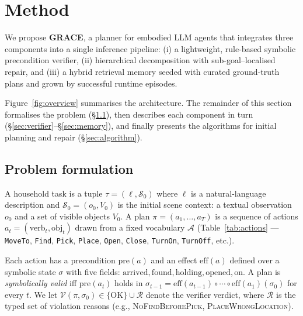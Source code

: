 
\section{Method}\label{sec:method}

We propose \textbf{GRACE}, a planner for embodied LLM agents that
integrates three components into a single inference pipeline:
(i) a lightweight, rule-based symbolic precondition verifier,
(ii) hierarchical decomposition with sub-goal--localised repair, and
(iii) a hybrid retrieval memory seeded with curated ground-truth plans
and grown by successful runtime episodes.

Figure~\ref{fig:overview} summarises the architecture. The remainder of
this section formalises the problem (\S\ref{sec:problem}), then describes
each component in turn (\S\ref{sec:verifier}--\S\ref{sec:memory}),
and finally presents the algorithms for initial planning and repair
(\S\ref{sec:algorithm}).

\subsection{Problem formulation}\label{sec:problem}

A household task is a tuple $\tau = (\ell, \mathcal{S}_0)$ where
$\ell$ is a natural-language description and
$\mathcal{S}_0 = (o_0, V_0)$ is the initial scene context: a textual
observation $o_0$ and a set of visible objects $V_0$. A plan
$\pi = (a_1, \dots, a_T)$ is a sequence of actions
$a_t = (\mathrm{verb}_t, \mathrm{obj}_t)$ drawn from a fixed
vocabulary $\mathcal{A}$ (Table~\ref{tab:actions} —
\texttt{MoveTo}, \texttt{Find}, \texttt{Pick}, \texttt{Place},
\texttt{Open}, \texttt{Close}, \texttt{TurnOn}, \texttt{TurnOff}, etc.).

Each action has a precondition $\mathrm{pre}(a)$ and an effect
$\mathrm{eff}(a)$ defined over a symbolic state $\sigma$ with five
fields: $\mathrm{arrived}, \mathrm{found}, \mathrm{holding},
\mathrm{opened}, \mathrm{on}$. A plan is \emph{symbolically valid}
iff $\mathrm{pre}(a_t)$ holds in
$\sigma_{t-1} = \mathrm{eff}(a_{t-1}) \circ \cdots \circ \mathrm{eff}(a_1)(\sigma_0)$
for every $t$. We let $\mathcal{V}(\pi, \sigma_0) \in \{\text{OK}\}
\cup \mathcal{R}$ denote the verifier verdict, where $\mathcal{R}$ is the
typed set of violation reasons (e.g.,
\textsc{NoFindBeforePick}, \textsc{PlaceWrongLocation}).

